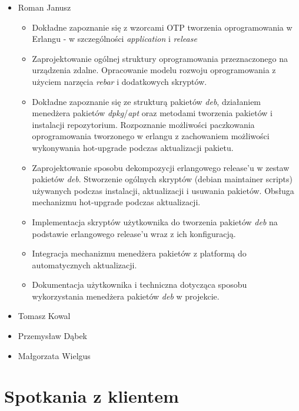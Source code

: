 \documentclass[polish,12pt]{aghthesis} \usepackage[utf8]{inputenc}
\begin{document}
\begin{itemize}
\item Roman Janusz
\begin{itemize}
\item Dokładne zapoznanie się z wzorcami OTP tworzenia oprogramowania w Erlangu - w szczególności \emph{application} i \emph{release}
\item Zaprojektowanie ogólnej struktury oprogramowania przeznaczonego na urządzenia zdalne. Opracowanie modelu rozwoju oprogramowania z użyciem narzęcia \emph{rebar} i dodatkowych skryptów.
\item Dokładne zapoznanie się ze strukturą pakietów \emph{deb}, działaniem menedżera pakietów \emph{dpkg}/\emph{apt} oraz metodami tworzenia pakietów i instalacji repozytorium. Rozpoznanie możliwości paczkowania oprogramowania tworzonego w erlangu z zachowaniem możliwości wykonywania hot-upgrade podczas aktualizacji pakietu.
\item Zaprojektowanie sposobu dekompozycji erlangowego release'u w zestaw pakietów \emph{deb}. Stworzenie ogólnych skryptów (debian maintainer scripts) używanych podczas instalacji, aktualizacji i usuwania pakietów. Obsługa mechanizmu hot-upgrade podczas aktualizacji.
\item Implementacja skryptów użytkownika do tworzenia pakietów \emph{deb} na podstawie erlangowego release'u wraz z ich konfiguracją.
\item Integracja mechanizmu menedżera pakietów z platformą do automatycznych aktualizacji.
\item Dokumentacja użytkownika i techniczna dotycząca sposobu wykorzystania menedżera pakietów \emph{deb} w projekcie.
\end{itemize}

\item Tomasz Kowal
\item Przemysław Dąbek
\item Małgorzata Wielgus
\end{itemize}

\section{Spotkania z klientem}
\end{document}
